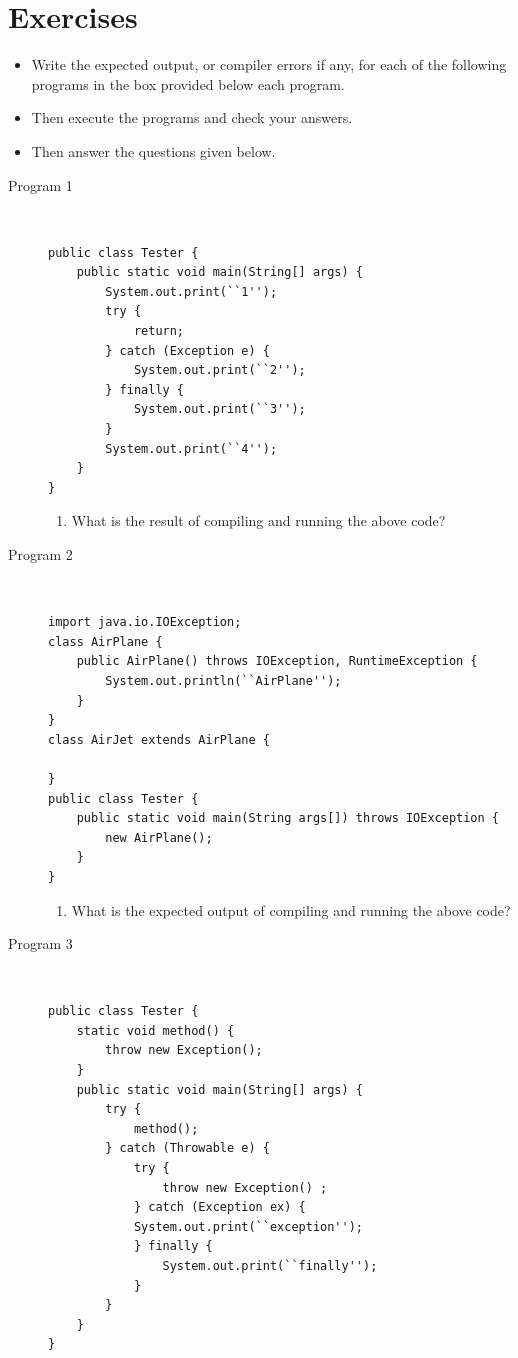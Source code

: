 \documentclass[11pt,a4paper]{article}
\def\AnswerBox{\fbox{\begin{minipage}{4in}\hfill\vspace{0.5in}\end{minipage}}}
\begin{document}
\section*{Exercises}
\begin{itemize}
    \item Write the expected output, or compiler errors if any, for each of the following programs in the box provided below each program.
    \item Then execute the programs and check your answers.
    \item Then answer the questions given below.
\end{itemize}
\begin{description}
\item [Program 1] \
\begin{lstlisting}
public class Tester {
    public static void main(String[] args) {
        System.out.print(``1'');
        try {
            return;
        } catch (Exception e) {
            System.out.print(``2'');
        } finally {
            System.out.print(``3'');
        }
        System.out.print(``4'');
    }
}
\end{lstlisting}

\AnswerBox

\begin{enumerate}[label=\bfseries Q\arabic*:]\itemsep10pt
\item What is the result of compiling and running the above code?
\end{enumerate}

\item [Program 2] \
\begin{lstlisting}
import java.io.IOException;
class AirPlane {
    public AirPlane() throws IOException, RuntimeException {
        System.out.println(``AirPlane'');
    }
}
class AirJet extends AirPlane {

}
public class Tester {
    public static void main(String args[]) throws IOException { 
        new AirPlane(); 
    }
}
\end{lstlisting}

\AnswerBox

\begin{enumerate}[label=\bfseries Q\arabic*:]\itemsep10pt
\item What is the expected output of compiling and running the above code?
\end{enumerate}

\item [Program 3] \
\begin{lstlisting}
public class Tester {
    static void method() {
        throw new Exception();
    }
    public static void main(String[] args) {
        try {
            method();
        } catch (Throwable e) {
            try {
                throw new Exception() ;
            } catch (Exception ex) {
            System.out.print(``exception'');
            } finally {
                System.out.print(``finally'');
            }
        }
    }
}
\end{lstlisting}


\end{description}
\end{document}
